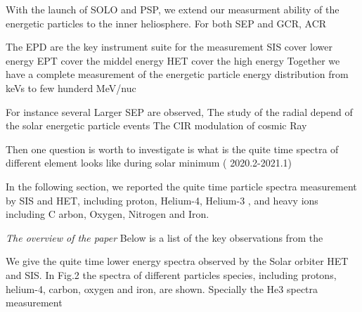 
With the launch of \ac{SOLO} and \ac{PSP}, we extend our measurment ability of the energetic particles to the inner heliosphere. For both SEP and GCR, ACR

The EPD are the key instrument suite for the measurement
SIS cover lower energy 
EPT cover the middel energy 
HET cover the high energy 
Together we have a complete measurement of the energetic particle energy distribution from keVs to few hunderd MeV/nuc

For instance several Larger SEP are observed, 
The study of the radial depend of the solar energetic particle events
The CIR modulation of cosmic Ray

Then one question is worth to investigate is what is the quite time spectra of different element looks like during solar minimum ( 2020.2-2021.1)

In the following section, we reported the quite time particle spectra measurement by  SIS and HET, including proton, Helium-4, Helium-3 , and heavy ions including C            arbon, Oxygen, Nitrogen and Iron.

\textit{The overview of the paper}
Below is a list of the key observations from the \citep{Mason-2021-SolOQuietTime}

We give the quite time lower energy spectra observed by the Solar orbiter HET and SIS. 
In Fig.2 the spectra of different particles species, including protons, helium-4, carbon, oxygen and iron, are shown.
Specially the He3 spectra measurement 


